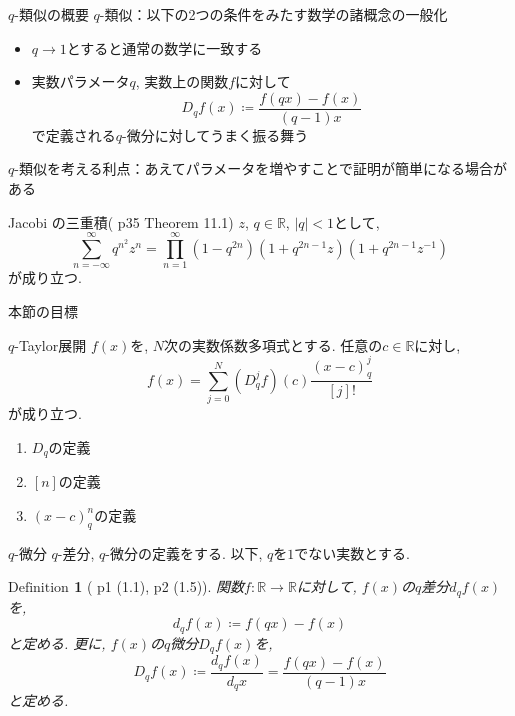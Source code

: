 \documentclass[dvipdfmx,cjk]{beamer}
\theoremstyle{mystyle}
\newtheorem{df}{$\textrm{Definition}$}[section]
\newcommand{\R}{\mathbb{R}}
\newcommand{\0}{\textbf{0}}
\begin{document}
\begin{frame}
  \tableofcontents[currentsection] 
\end{frame}

\begin{frame}{$q$-類似の概要}
  $q$-類似：以下の2つの条件をみたす数学の諸概念の一般化 \pause
  \begin{itemize}
    \item $q \to 1$とすると通常の数学に一致する \pause
    \item 実数パラメータ$q$, 実数上の関数$f$に対して
      \[
        D_q f(x) \coloneqq \frac{f(qx) - f(x)}{(q - 1) x}
      \]
    で定義される$q$-微分に対してうまく振る舞う \pause
  \end{itemize}
  $q$-類似を考える利点：あえてパラメータを増やすことで証明が簡単になる場合がある \pause
  \begin{itembox}{Jacobi の三重積(\cite{Kac} p35 Theorem 11.1)}
    $z$, $q \in \R$, $|q| < 1$として, 
    \[
      \sum_{n = -\infty}^{\infty} q^{n^2} z^n =
      \prod_{n = 1}^{\infty} (1 - q^{2n})(1 + q^{2n - 1}z)(1 + q^{2n - 1}z^{-1})
    \]
    が成り立つ. 
  \end{itembox}
\end{frame}

\begin{frame}{本節の目標}
	\begin{itembox}{$q$-Taylor展開}
		$f(x)$を, $N$次の実数係数多項式とする. 任意の$c\in\R$に対し, 
		\[
			f(x) = \sum_{j=0}^N (D_q^jf)(c)\frac{(x-c)^j_q}{[j]!}
		\]
		が成り立つ. 
	\end{itembox} \pause
	\begin{enumerate}
		\item $D_q$の定義 \pause
		\item $[n]$の定義 \pause
		\item $(x -c)^n_q$の定義
	\end{enumerate}
\end{frame}

\begin{frame}{$q$-微分}
  $q$-差分, $q$-微分の定義をする. 以下, $q$を$1$でない実数とする. \pause
  \begin{df}[\cite{Kac} p1 (1.1), p2 (1.5)]
    関数$f : \R \to \R$に対して, $f(x)$の$q$差分$d_q f(x)$を, 
    \[
      d_q f(x) \coloneqq f (qx) - f(x)
    \]
    と定める. 更に, $f(x)$の$q$微分$D_q f(x)$を, 
    \[
      D_q f(x) \coloneqq \frac{d_q f(x)}{d_q x} = \frac{f(qx) - f(x)}{(q - 1) x}
    \]
    と定める. 
  \end{df}
\end{frame}
\end{document}
